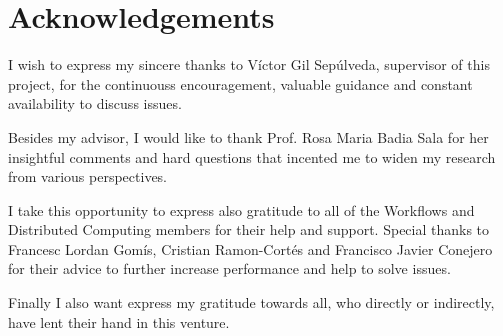 \chapter{Acknowledgements}

I wish to express my sincere thanks to Víctor Gil Sepúlveda, supervisor of this project, for the continuouss encouragement, valuable guidance and constant availability to discuss issues.

Besides my advisor, I would like to thank Prof. Rosa Maria Badia Sala for her insightful comments and hard questions that incented me to widen my research from various perspectives.

I take this opportunity to express also gratitude to all of the Workflows and Distributed Computing members for their help and support. Special thanks to Francesc Lordan Gomís, Cristian Ramon-Cortés and Francisco Javier Conejero for their advice to further increase performance and help to solve issues.

Finally I also want express my gratitude towards all, who directly or indirectly, have lent their hand in this venture.